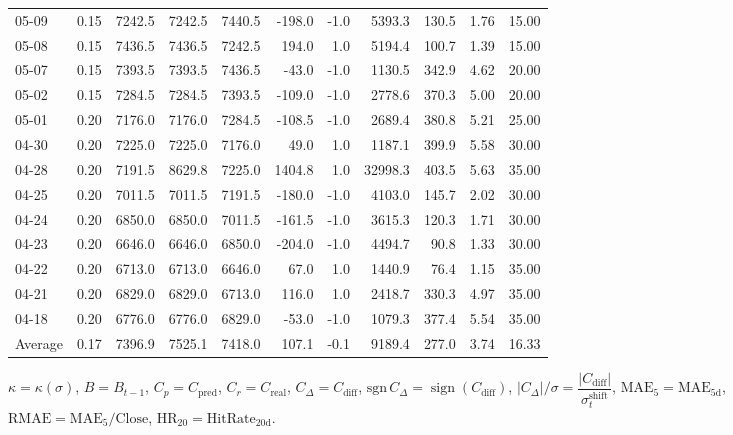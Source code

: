 \begin{threeparttable}
{\begin{tabular}{lrrrrrrrrrr}
05-09 & 0.15 & 7242.5 & 7242.5 & 7440.5 & -198.0 & -1.0 & 5393.3 & 130.5 & 1.76 & 15.00 \\
05-08 & 0.15 & 7436.5 & 7436.5 & 7242.5 & 194.0 & 1.0 & 5194.4 & 100.7 & 1.39 & 15.00 \\
05-07 & 0.15 & 7393.5 & 7393.5 & 7436.5 & -43.0 & -1.0 & 1130.5 & 342.9 & 4.62 & 20.00 \\
05-02 & 0.15 & 7284.5 & 7284.5 & 7393.5 & -109.0 & -1.0 & 2778.6 & 370.3 & 5.00 & 20.00 \\
05-01 & 0.20 & 7176.0 & 7176.0 & 7284.5 & -108.5 & -1.0 & 2689.4 & 380.8 & 5.21 & 25.00 \\
04-30 & 0.20 & 7225.0 & 7225.0 & 7176.0 & 49.0 & 1.0 & 1187.1 & 399.9 & 5.58 & 30.00 \\
04-28 & 0.20 & 7191.5 & 8629.8 & 7225.0 & 1404.8 & 1.0 & 32998.3 & 403.5 & 5.63 & 35.00 \\
04-25 & 0.20 & 7011.5 & 7011.5 & 7191.5 & -180.0 & -1.0 & 4103.0 & 145.7 & 2.02 & 30.00 \\
04-24 & 0.20 & 6850.0 & 6850.0 & 7011.5 & -161.5 & -1.0 & 3615.3 & 120.3 & 1.71 & 30.00 \\
04-23 & 0.20 & 6646.0 & 6646.0 & 6850.0 & -204.0 & -1.0 & 4494.7 & 90.8 & 1.33 & 30.00 \\
04-22 & 0.20 & 6713.0 & 6713.0 & 6646.0 & 67.0 & 1.0 & 1440.9 & 76.4 & 1.15 & 35.00 \\
04-21 & 0.20 & 6829.0 & 6829.0 & 6713.0 & 116.0 & 1.0 & 2418.7 & 330.3 & 4.97 & 35.00 \\
04-18 & 0.20 & 6776.0 & 6776.0 & 6829.0 & -53.0 & -1.0 & 1079.3 & 377.4 & 5.54 & 35.00 \\
Average & 0.17 & 7396.9 & 7525.1 & 7418.0 & 107.1 & -0.1 & 9189.4 & 277.0 & 3.74 & 16.33 \\
\bottomrule
\end{tabular}
}%
\begin{tablenotes}\footnotesize
\item $\kappa=\kappa(\sigma)$, $B=B_{t-1}$, $C_p=C_{\text{pred}}$, $C_r=C_{\text{real}}$, $C_\Delta=C_{\text{diff}}$, $\mathrm{sgn}\,C_\Delta=\operatorname{sign}(C_{\text{diff}})$, $|C_\Delta|/\sigma=\dfrac{|C_{\text{diff}}|}{\sigma_t^{\text{shift}}}$, $\mathrm{MAE}_5=\mathrm{MAE}_{5\text{d}}$, $\mathrm{RMAE}= \mathrm{MAE}_5 / \text{Close}$, $\mathrm{HR}_{20}=\mathrm{HitRate}_{20\text{d}}$.
\end{tablenotes}
\end{threeparttable}
\endgroup